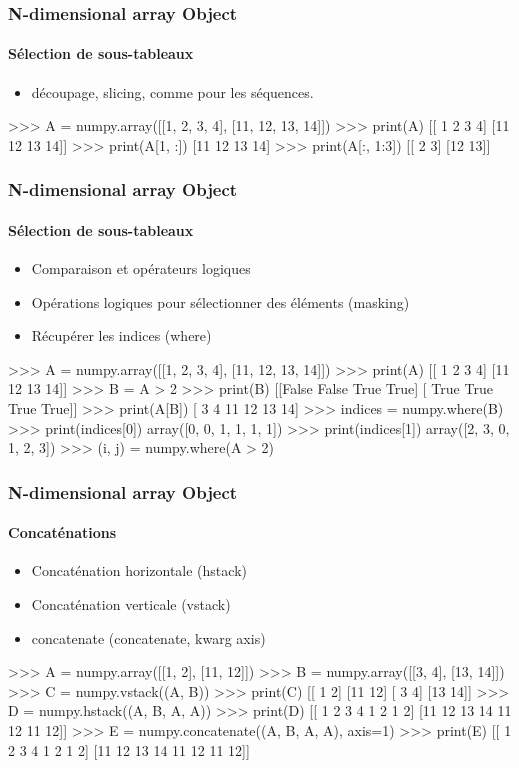 \begin{frame}[fragile]
\frametitle{N-dimensional array Object}
\framesubtitle{Sélection de sous-tableaux}
\begin{itemize}
 \item découpage, slicing, comme pour les séquences.
\end{itemize}
\begin{pythonConsole}
>>> A = numpy.array([[1, 2, 3, 4], [11, 12, 13, 14]])
>>> print(A)
[[ 1  2  3  4]
 [11 12 13 14]]
>>> print(A[1, :])
[11 12 13 14]
>>> print(A[:, 1:3])
[[ 2  3]
 [12 13]]
\end{pythonConsole}
\end{frame}
\begin{frame}[fragile]
\frametitle{N-dimensional array Object}
\framesubtitle{Sélection de sous-tableaux}
\begin{itemize}
 \item Comparaison et opérateurs logiques
 \item Opérations logiques pour sélectionner des éléments (masking)
 \item Récupérer les indices (where)
\end{itemize}
\begin{pythonConsole}
>>> A = numpy.array([[1, 2, 3, 4], [11, 12, 13, 14]])
>>> print(A)
[[ 1  2  3  4]
 [11 12 13 14]]
>>> B = A > 2
>>> print(B)
[[False False  True  True]
 [ True  True  True  True]]
>>> print(A[B])
[ 3  4 11 12 13 14]
>>> indices = numpy.where(B)
>>> print(indices[0])
array([0, 0, 1, 1, 1, 1])
>>> print(indices[1])
array([2, 3, 0, 1, 2, 3])
>>> (i, j) = numpy.where(A > 2)
\end{pythonConsole}
\end{frame}
\begin{frame}[fragile]
\frametitle{N-dimensional array Object}
\framesubtitle{Concaténations}
\begin{itemize}
 \item Concaténation horizontale (hstack)
 \item Concaténation verticale (vstack)
 \item concatenate (concatenate, kwarg axis)
\end{itemize}
\begin{pythonConsole}
>>> A = numpy.array([[1, 2], [11, 12]])
>>> B = numpy.array([[3, 4], [13, 14]])
>>> C = numpy.vstack((A, B))
>>> print(C)
[[ 1  2]
 [11 12]
 [ 3  4]
 [13 14]]
>>> D = numpy.hstack((A, B, A, A))
>>> print(D)
[[ 1  2  3  4  1  2  1  2]
 [11 12 13 14 11 12 11 12]]
>>> E = numpy.concatenate((A, B, A, A), axis=1)
>>> print(E)
[[ 1  2  3  4  1  2  1  2]
 [11 12 13 14 11 12 11 12]]
\end{pythonConsole}
\end{frame}
